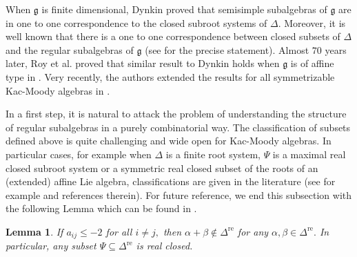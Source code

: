 \documentclass[12pt,reqno]{amsart}
\theoremstyle{plain}
\newtheorem{lem}{Lemma}
\theoremstyle{definition}
\theoremstyle{remark}
\newcommand{\lie}[1]{\mathfrak{#1}}
\begin{document}
When $\lie g$ is finite dimensional, Dynkin \cite{dynkin1952semisimple} proved that semisimple subalgebras of $\lie g$ are in one to one correspondence to the closed subroot systems of $\Delta.$ Moreover, it is well known that there is a one to one correspondence between closed subsets of $\Delta$ and the regular subalgebras of $\lie g$ (see \cite[Proposition 4.1]{DdeG21} for the precise statement). Almost $70$ years later, Roy et al. proved that similar result to Dynkin holds when $\lie g$ is of affine type in \cite{roy2019maximal}. Very recently, the authors extended the results for all symmetrizable Kac-Moody algebras in \cite{habib2023root}.

In a first step, it is natural to attack the problem of understanding the structure of regular subalgebras in a purely combinatorial way. The classification of subsets defined above is quite challenging and wide open for Kac-Moody algebras. In particular cases, for example when $\Delta$ is a finite root system, $\Psi$ is a maximal real closed subroot system or a symmetric real closed subset of the roots of an (extended) affine Lie algebra, classifications are given in the literature (see for example \cite{BHV23a,DdeG21,KV21a,roy2019maximal} and references therein).
For future reference, we end this subsection with the following Lemma which can be found in \cite{habib2023root}.
\begin{lem}\label{sumnotreal}
    If $a_{ij}\le -2$ for all $i\neq j,$ then $\alpha+\beta\notin \Delta^{\mathrm{re}}$ for any $\alpha,\beta\in \Delta^{\mathrm{re}}.$ 
    In particular, any subset $\Psi\subseteq \Delta^{\mathrm{re}}$ is real closed. 
    \end{lem}
\end{document}
